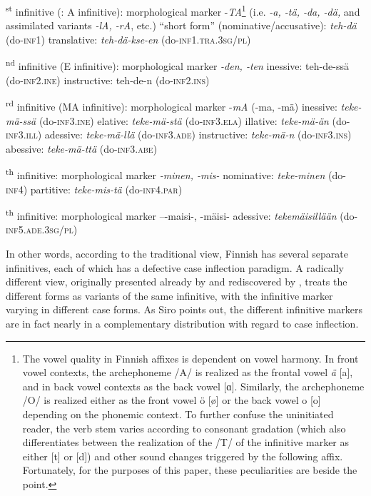 \documentclass[output=paper, colorlinks,citecolor=brown]{langsci/langscibook}
\begin{document}
\ea
  \textsuperscript{st} infinitive (\citealt{HakulinenEtAl2004}: A infinitive):
   \ea  morphological marker -\textit{TA}\footnote{The vowel quality in Finnish affixes is dependent on vowel harmony. In front vowel contexts, the archephoneme /A/ is realized as the frontal vowel \textit{ä} [a], and in back vowel contexts as the back vowel [ɑ]. Similarly, the archephoneme /O/ is realized either as the front vowel ö [ø] or the back vowel o [o] depending on the phonemic context. To further confuse the uninitiated reader, the verb stem varies according to consonant gradation (which also differentiates between the realization of the /T/ of the infinitive marker as either [t] or [d]) and other sound changes triggered by the following affix. Fortunately, for the purposes of this paper, these peculiarities are beside the point.} (i.e. \textit{{}-a, -tä, -da, -dä,} and assimilated variants \textit{{}-lA, -rA}, etc.)
   \ex “short form” (nominative/accusative): \textit{teh-dä} (do-\textsc{inf1)}
   \ex translative: \textit{teh-dä-kse-en} (do-\textsc{inf1.tra.3sg/pl)}
   \z


  \textsuperscript{nd} infinitive (E infinitive):
    \ea  morphological marker \textit{{}-den, -ten}
    \ex inessive: teh-de-ssä (do-\textsc{inf2.ine)}
    \ex instructive: teh-de-n (do-\textsc{inf2.ins)}
    \z
    
  \textsuperscript{rd} infinitive (MA infinitive):
    \ea morphological marker -\textit{mA} (-ma, -mä)
    \ex inessive: \textit{teke-mä-ssä} (do-\textsc{inf3.ine)}
    \ex elative: \textit{teke-mä-stä} (do-\textsc{inf3.ela)}
    \ex illative: \textit{teke-mä-än} (do-\textsc{inf3.ill)}
    \ex adessive: \textit{teke-mä-llä} (do-\textsc{inf3.ade)}
    \ex instructive: \textit{teke-mä-n} (do-\textsc{inf3.ins)}
    \ex abessive: \textit{teke-mä-ttä} (do-\textsc{inf3.abe)}
    \z

  \textsuperscript{th} infinitive:
    \ea morphological marker \textit{{}-minen, -mis-}
    \ex nominative: \textit{teke-minen} (do-\textsc{inf4)}
    \ex partitive: \textit{teke-mis-tä} (do-\textsc{inf4.par)}
    \z

  \textsuperscript{th} infinitive:
    \ea morphological marker –-maisi-, -mäisi-
    \ex adessive: \textit{tekemäisillään} (do-\textsc{inf5.ade.3sg/pl)}
    \z
  \z
\z

In other words, according to the traditional view, Finnish has several separate infinitives, each of which has a defective case inflection paradigm. A radically different view, originally presented already by \citet[44]{Lönnrot1841} and rediscovered by \citet{Siro1964}, treats the different forms as variants of the same infinitive, with the infinitive marker varying in different case forms. As Siro points out, the different infinitive markers are in fact nearly in a complementary distribution with regard to case inflection.
\end{document}
